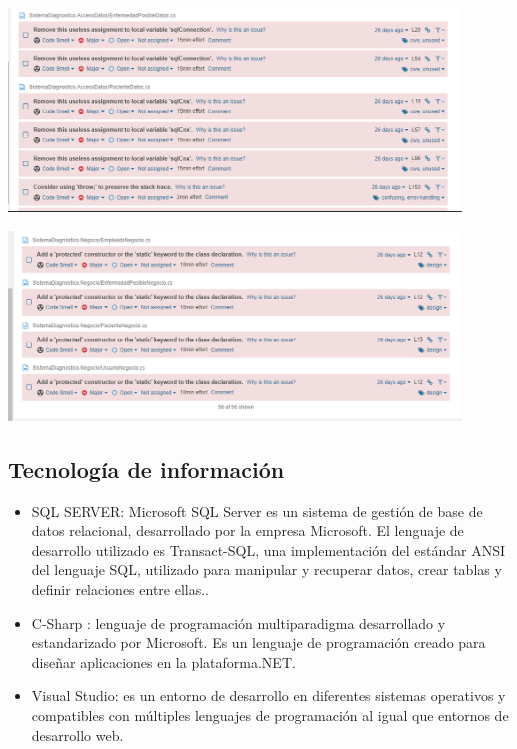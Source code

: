 \documentclass[preprint,12pt]{elsarticle}
\begin{document}
\begin{itemize}
\begin{center}
\end{center}
\begin{center}
	\includegraphics[width=12cm]{./imagen/foto7.png}
\end{center}
\begin{center}
	\includegraphics[width=12cm]{./imagen/foto8.png}
\end{center}


\end{itemize}

\subsection{\textbf{Tecnología de información  }}
		\begin{itemize}
	\item 	SQL SERVER: Microsoft SQL Server es un sistema de gestión de base de datos relacional, desarrollado por la empresa Microsoft. El lenguaje de desarrollo utilizado es Transact-SQL, una implementación del estándar ANSI del lenguaje SQL, utilizado para manipular y recuperar datos, crear tablas y definir relaciones entre ellas..
	\item 	C-Sharp : lenguaje de programación multiparadigma desarrollado y estandarizado por Microsoft. Es un lenguaje de programación creado para diseñar aplicaciones en la plataforma.NET.
	\item 	Visual Studio: es un entorno de desarrollo en diferentes sistemas operativos y compatibles con múltiples lenguajes de programación al igual que entornos de desarrollo web. 
	\end{itemize}
\end{document}
